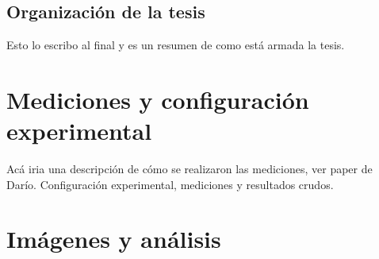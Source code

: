 \section{Organización de la tesis}
Esto lo escribo al final y es un resumen de como está armada la tesis.



\chapter{Mediciones y configuración\\ experimental}
Acá iria una descripción de cómo se realizaron las mediciones, ver paper de Darío. Configuración experimental, mediciones y resultados crudos.
\chapter{Imágenes y análisis}
